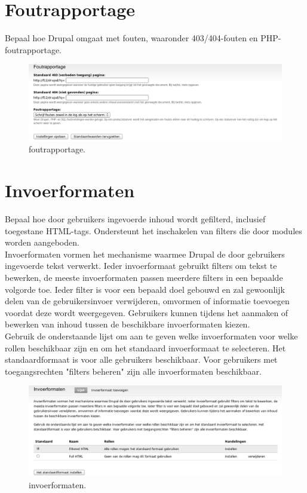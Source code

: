 \section{Foutrapportage} 
    Bepaal hoe Drupal omgaat met fouten, waaronder 403/404-fouten en PHP-foutrapportage.
 \begin{figure}[!h]
    \centering
   \includegraphics[scale=0.3,angle=0]{foutrapportage}
   \caption{foutrapportage.\label{white}}
 \end{figure}    
    
\section{Invoerformaten}  
    Bepaal hoe door gebruikers ingevoerde inhoud wordt gefilterd, inclusief toegestane HTML-tags. 
    Ondersteunt het inschakelen van filters die door modules worden aangeboden.
    \\
    Invoerformaten vormen het mechanisme waarmee Drupal de door gebruikers ingevoerde tekst verwerkt. 
    Ieder invoerformaat gebruikt filters om tekst te bewerken, de meeste invoerformaten passen meerdere 
    filters in een bepaalde volgorde toe. Ieder filter is voor een bepaald doel gebouwd en zal gewoonlijk 
    delen van de gebruikersinvoer verwijderen, omvormen of informatie toevoegen voordat deze wordt weergegeven. 
    Gebruikers kunnen tijdens het aanmaken of bewerken van inhoud tussen de beschikbare invoerformaten kiezen.
\\
Gebruik de onderstaande lijst om aan te geven welke invoerformaten voor welke rollen beschikbaar zijn en 
om het standaard invoerformaat te selecteren. Het standaardformaat is voor alle gebruikers beschikbaar. 
Voor gebruikers met toegangsrechten "filters beheren" zijn alle invoerformaten beschikbaar.
 \begin{figure}[!h]
    \centering
   \includegraphics[scale=0.3,angle=0]{invoerformaten}
   \caption{invoerformaten.\label{white}}
 \end{figure}     
    
